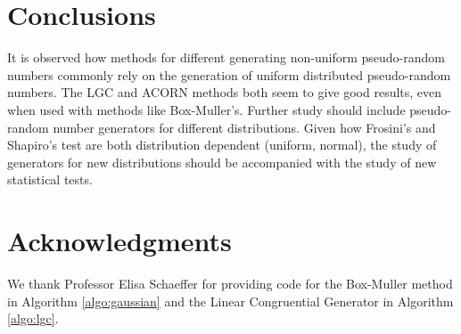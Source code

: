 \documentclass[letterpaper, 10 pt, conference]{article}
\begin{document}
\section{Conclusions}
It is observed how methods for different generating non-uniform pseudo-random numbers commonly rely on the generation of uniform distributed pseudo-random numbers. The \textsc{LGC} and \textsc{ACORN} methods both seem to give good results, even when used with methods like Box-Muller's. Further study should include pseudo-random number generators for different distributions. Given how Frosini's and Shapiro's test are both distribution dependent (uniform, normal), the study of generators for new distributions should be accompanied with the study of new statistical tests.

\section{Acknowledgments}
We thank Professor Elisa Schaeffer for providing code for the Box-Muller method in Algorithm \ref{algo:gaussian} and the Linear Congruential Generator in Algorithm \ref{algo:lgc}.







\end{document}
